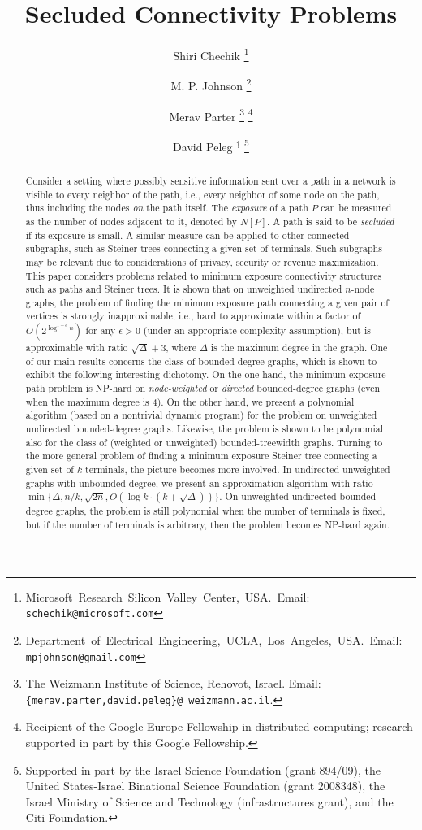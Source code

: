 \documentclass[12pt]{article}
\title{Secluded Connectivity Problems}
\author{
Shiri Chechik
\thanks{
\hbox{Microsoft Research Silicon Valley Center, USA. Email:}
{\tt schechik@microsoft.com}}
\and
M. P. Johnson
\thanks{
\hbox{Department of Electrical Engineering, UCLA, Los Angeles, USA. Email:}
{\tt mpjohnson@gmail.com}}
\and
Merav Parter
\thanks{The Weizmann Institute of Science, Rehovot, Israel.
Email: {\tt \{merav.parter,david.peleg\}@ weizmann.ac.il}.}
\thanks{Recipient of the Google Europe Fellowship in distributed computing;
 research supported in part by this Google Fellowship.}
\and
David Peleg $^\ddagger$
\thanks{Supported in part by the Israel Science Foundation
(grant 894/09), the United States-Israel Binational Science Foundation
(grant 2008348), the Israel Ministry of Science and Technology
(infrastructures grant), and the Citi Foundation.}
}
\newcommand{\MAXDEG}[0]{\Delta}
\begin{document}
\maketitle

\begin{abstract}
Consider a setting where possibly sensitive information sent over a path in a network is visible to every {neighbor} of the path, i.e., every neighbor of some node on the path, thus including the nodes {\em on} the path itself. The {\em exposure} of a path $P$ can be measured as the number of nodes adjacent to it, denoted by $N[P]$. A path is said to be {\em secluded} if its exposure is small. A similar measure can be applied to other connected subgraphs, such as Steiner trees connecting a given set of terminals. Such subgraphs may be relevant due to considerations of privacy, security or revenue maximization.
This paper considers problems related to minimum exposure connectivity structures such as paths and Steiner trees. It is shown that on unweighted undirected $n$-node graphs, the problem of finding the minimum exposure path connecting a given pair of vertices is strongly inapproximable, i.e., hard to approximate within a factor of $O(2^{\log^{1-\epsilon}n})$ for any $\epsilon>0$ (under an appropriate complexity assumption), but is approximable with ratio $\sqrt{\MAXDEG}+3$, where $\MAXDEG$ is the maximum degree in the graph. One of our main results concerns the class of bounded-degree graphs, which is shown to exhibit the following interesting dichotomy. On the one hand, the minimum exposure path problem is NP-hard on \emph{node-weighted} or \emph{directed} bounded-degree graphs (even when the maximum degree is 4). On the other hand, we present a polynomial algorithm (based on a nontrivial dynamic program) for the problem on unweighted undirected bounded-degree graphs. Likewise, the problem is shown to be polynomial also for the class of  (weighted or unweighted) bounded-treewidth graphs.
Turning to the more general problem of finding a minimum exposure Steiner tree connecting a given set of $k$ terminals, the picture becomes more involved. In undirected unweighted graphs with unbounded degree, we present an approximation algorithm with ratio $\min\{\MAXDEG, n/k, \sqrt{2n},O(\log k \cdot (k+\sqrt{\MAXDEG}))\}$. On unweighted undirected bounded-degree graphs, the problem is still polynomial when the number of terminals is fixed, but if the number of terminals is arbitrary, then the problem becomes NP-hard again.
\end{abstract}
\end{document}
